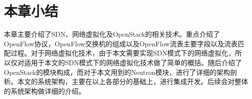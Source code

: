 \section{本章小结}
本章主要介绍了SDN、网络虚拟化及OpenStack的相关技术。重点介绍了OpenFlow协议，OpenFlow交换机的组成以及OpenFlow流表主要字段以及流表匹配过程。对于网络虚拟化技术，由于本文需要实现SDN模式下的网络虚拟化，所以仅对适用于本文的SDN模式下的网络虚拟化技术做了简单的概括。随后介绍了OpenStack的模块构成，而对于本文用到的Neutron模块，进行了详细的架构剖析。本文的系统架构，主要在以上各部分的基础上，进行集成开发。后续会对整体的系统架构做详细的介绍。